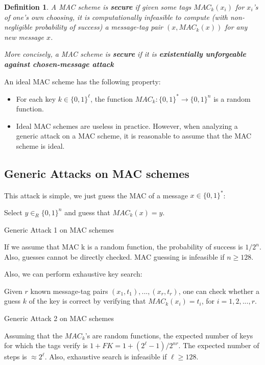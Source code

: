\documentclass[12pt,titlepage]{article}
\newtheorem{protodefinition}[prototheorem]{Definition}
\newenvironment{definition}
{\colorlet{shadecolor}{cyan!15}\begin{shaded}\begin{protodefinition}\normalfont}{\end{protodefinition}\end{shaded}}
\begin{document}
\begin{definition}
	A MAC scheme is \textbf{secure} if given some tags $MAC_k (x_i)$ for $x_i$'s of one’s own choosing, it is computationally infeasible to compute (with non-negligible probability of success) a message-tag pair $(x, MAC_k(x))$ for any new message $x$.
	
	More concisely, a MAC scheme is \textbf{secure} if it is \textbf{existentially unforgeable against chosen-message attack}
\end{definition}

An ideal MAC scheme has the following property:\begin{itemize}
\item For each key $k \in \{0,1\}^{\ell}$, the function $MAC_k : \{0, 1\}^{*} \rightarrow \{0, 1\}^{n}$ is a random function.
\item Ideal MAC schemes are useless in practice. However, when analyzing a generic attack on a MAC scheme, it is reasonable to assume that the MAC scheme is ideal.
\end{itemize}

\subsection{Generic Attacks on MAC schemes}
This attack is simple, we just guess the MAC of a message $x \in \{0,1\}^*$: \begin{algorithm}
Select $y \in_R \{0,1\}^n$ and guess that $MAC_k (x) = y$.
\caption{Generic Attack 1 on MAC schemes}
\end{algorithm}

If we assume that MAC k is a random function, the probability of success is $1/2^n$. Also, guesses cannot be directly checked. MAC guessing is infeasible if $n \geq 128$.


Also, we can perform exhaustive key search: \begin{algorithm}
Given $r$ known message-tag pairs $(x_1,t_1),..., (x_r,t_r)$, one can check whether a guess $k$ of the key is correct by verifying that $MAC_k (x_i) = t_i$, for $i=1, 2, ..., r$.
\caption{Generic Attack 2 on MAC schemes}
\end{algorithm}

Assuming that the $MAC_k$’s are random functions, the expected number of keys for which the tags verify is $1 + FK = 1 + (2^\ell -1)/2^{nr}$. The expected number of steps is $\approx 2^\ell$. Also, exhaustive search is infeasible if $\ell \geq 128$.
\end{document}
